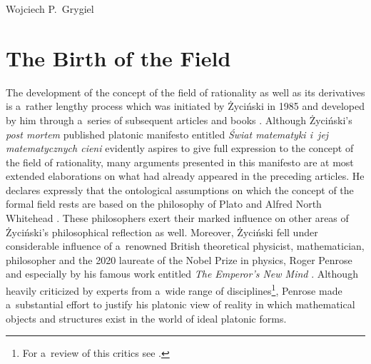 \begin{artengenv}{Wojciech P.~Grygiel}
\section{The Birth of the Field}
The development of the concept of the field of rationality as well as its derivatives is a~rather lengthy process which was initiated by Życiński in 1985 and developed by him through a~series of subsequent articles and books
\parencites[][]{zycinski_teizm_1985}[][]{zycinski_filozoficzne_1987}[][]{zycinski_teizm_1988}[][]{zycinski_poza_1991}[][]{zycinski_status_1995}[][]{zycinski_pole_2006}[][]{zycinski_swiat_2013}. %
 Although Życiński's \textit{post mortem} published platonic manifesto entitled \textit{Świat matematyki i~jej matematycznych cieni} 
\parencites[][]{zycinski_swiat_2011}[][]{zycinski_swiat_2013} %
 evidently aspires to give full expression to the concept of the field of rationality, many arguments presented in this manifesto are at most extended elaborations on what had already appeared in the preceding articles. He declares expressly that the ontological assumptions on which the concept of the formal field rests are based on the philosophy of Plato and Alfred North Whitehead 
\parencite[][p.171]{zycinski_filozoficzne_1987}. %
 These philosophers exert their marked influence on other areas of Życiński's philosophical reflection as well. Moreover, Życiński fell under considerable influence of a~renowned British theoretical physicist, mathematician, philosopher and the 2020 laureate of the Nobel Prize in physics, Roger Penrose and especially by his famous work entitled \textit{The Emperor's New Mind} 
\parencite*[][]{penrose_emperors_1989}. %
 Although heavily criticized by experts from a~wide range of disciplines\footnote{For a~review of this critics see 
\parencite[][]{grygiel_rogera_2009}.%
}, Penrose made a~substantial effort to justify his platonic view of reality in which mathematical objects and structures exist in the world of ideal platonic forms.


\end{artengenv}
